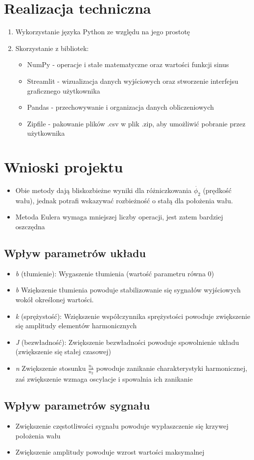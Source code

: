 \documentclass[12pt, a4paper]{article}
\begin{document}
\section*{Realizacja techniczna}
	\begin{enumerate}
		\item Wykorzystanie języka Python ze względu na jego prostotę
		\item Skorzystanie z bibliotek:
			\begin{itemize}
				\item NumPy - operacje i stałe matematyczne oraz wartości funkcji sinus
				\item Streamlit - wizualizacja danych wyjściowych oraz stworzenie interfejsu graficznego użytkownika
				\item Pandas - przechowywanie i organizacja danych obliczeniowych
				\item Zipfile - pakowanie plików .csv w plik .zip, aby umożliwić pobranie przez użytkownika
			\end{itemize}
	\end{enumerate}
\section*{Wnioski projektu}
	\begin{itemize}
		\item Obie metody dają bliskozbieżne wyniki dla różniczkowania $\dot{\phi_2}$ (prędkość wału), jednak potrafi wskazywać rozbieżność o stałą dla położenia wału.
		\item Metoda Eulera wymaga mniejszej liczby operacji, jest zatem bardziej oszczędna
	\end{itemize}
\subsection{Wpływ parametrów układu}
	\begin{itemize}
		\item \emph{b} (tłumienie): Wygaszenie tłumienia (wartość parametru równa 0) 
		\item \emph{b} Wziększenie tłumienia powoduje stabilizowanie się sygnałów wyjściowych wokół określonej wartości. 
		\item \emph{k} (sprężystość): Wziększenie współczynnika sprężystości powoduje zwiększenie się amplitudy elementów harmonicznych 
		\item \emph{J} (bezwładność): Zwiększenie bezwładności powoduje spowolnienie układu (zwiększenie się stałej czasowej)
		\item \emph{n} Zwiększenie stosunku $\frac{n_1}{n_2}$ powoduje zanikanie charakterystyki harmonicznej, zaś zwiększenie wzmaga oscylacje i spowalnia ich zanikanie
	\end{itemize}
\subsection{Wpływ parametrów sygnału}
	\begin{itemize}
		\item Zwiększenie częstotliwości sygnału powoduje wypłaszczenie się krzywej położenia wału
		\item Zwiększenie amplitudy powoduje wzrost wartości maksymalnej
	\end{itemize}
\end{document}
